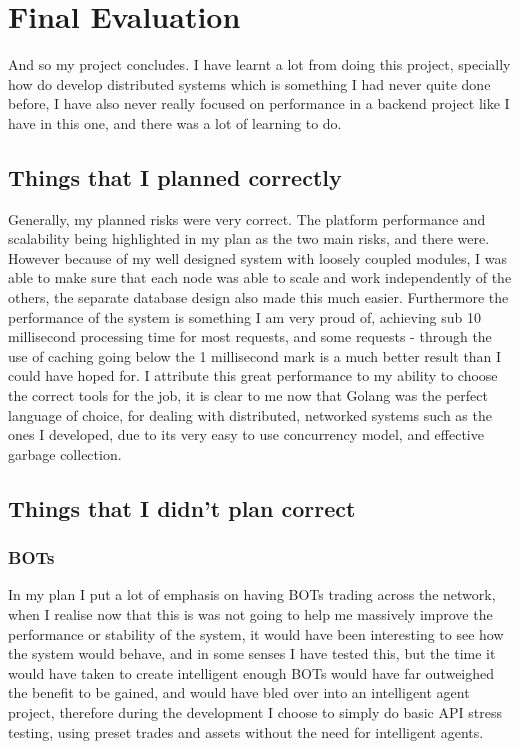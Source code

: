 \documentclass[titlepage]{article}
\begin{document}
\pagebreak
\section{Final Evaluation}

And so my project concludes. I have learnt a lot from doing this project, specially how do develop distributed systems which is something I had never quite done before, I have also never really focused on performance in a backend project like I have in this one, and there was a lot of learning to do. \\

\subsection{Things that I planned correctly}
Generally, my planned risks were very correct. The platform performance and scalability being highlighted in my plan as the two main risks, and there were. However because of my well designed system with loosely coupled modules, I was able to make sure that each node was able to scale and work independently of the others, the separate database design also made this much easier. Furthermore the performance of the system is something I am very proud of, achieving sub 10 millisecond processing time for most requests, and some requests - through the use of caching going below the 1 millisecond mark is a much better result than I could have hoped for. I attribute this great performance to my ability to choose the correct tools for the job, it is clear to me now that Golang was the perfect language of choice, for dealing with distributed, networked systems such as the ones I developed, due to its very easy to use concurrency model, and effective garbage collection. \\

\subsection{Things that I didn't plan correct}

\subsubsection{BOTs}
In my plan I put a lot of emphasis on having BOTs trading across the network, when I realise now that this is was not going to help me massively improve the performance or stability of the system, it would have been interesting to see how the system would behave, and in some senses I have tested this, but the time it would have taken to create intelligent enough BOTs would have far outweighed the benefit to be gained, and would have bled over into an intelligent agent project, therefore during the development I choose to simply do basic API stress testing, using preset trades and assets without the need for intelligent agents. \\
\end{document}
